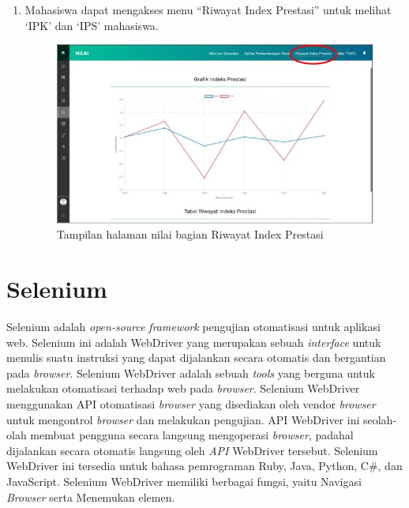 \begin{enumerate}
\begin{enumerate}
\begin{figure}[H]
			\label{fig:nilai_2018}
		\end{figure}
		\item Mahasiswa dapat mengakses menu ``Riwayat Index Prestasi'' untuk melihat `IPK' dan `IPS' mahasiswa.
		\begin{figure}[H]
			\centering
			\includegraphics[scale=0.7]{Gambar/rip2018.jpg}
			\caption{Tampilan halaman nilai bagian Riwayat Index Prestasi} 
			\label{fig:rip_2018}
		\end{figure}
	\end{enumerate}	
\end{enumerate}

\section{Selenium}
\label{sec:selenium}
Selenium adalah \textit{open-source} \textit{framework} pengujian otomatisasi untuk aplikasi web\cite{selenium}. Selenium ini adalah WebDriver yang merupakan sebuah \textit{interface} untuk menulis suatu instruksi yang dapat dijalankan secara otomatis dan bergantian pada \textit{browser}.  Selenium WebDriver adalah sebuah \textit{tools} yang berguna untuk melakukan otomatisasi terhadap web pada \textit{browser}. Selenium WebDriver menggunakan API otomatisasi \textit{browser} yang disediakan oleh vendor \textit{browser} untuk mengontrol \textit{browser} dan melakukan pengujian. API WebDriver ini seolah-olah membuat pengguna secara langsung mengoperasi \textit{browser}, padahal dijalankan secara otomatis langsung oleh \textit{API} WebDriver tersebut. Selenium WebDriver ini tersedia untuk bahasa pemrograman Ruby, Java, Python, C\#, dan JavaScript. Selenium WebDriver memiliki berbagai fungsi, yaitu Navigasi \textit{Browser} serta Menemukan elemen.

